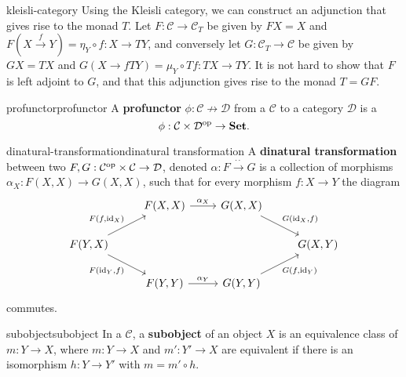 \begin{example}{kleisli-category}
    Using the Kleisli category, we can construct an adjunction that gives rise to the monad $T$. Let $F : \mathcal{C} \to \mathcal{C}_T$ be given by $FX = X$ and $F(X \xrightarrow{f} Y) = \eta_Y \circ f : X \to TY$, and conversely let $G : \mathcal{C}_T \to \mathcal{C}$ be given by $GX = TX$ and $G(X \rightarrow{f} TY) = \mu_Y \circ Tf : TX \to TY$. It is not hard to show that $F$ is left adjoint to $G$, and that this adjunction gives rise to the monad $T = GF$.
\end{example}

\begin{topic}{profunctor}{profunctor}
    A \textbf{profunctor} $\phi : \mathcal{C} \nrightarrow \mathcal{D}$ from a  $\mathcal{C}$ to a category $\mathcal{D}$ is a 
    \[ \phi : \mathcal{C} \times \mathcal{D}^\textup{op} \to \textbf{Set} . \]
\end{topic}

\begin{topic}{dinatural-transformation}{dinatural transformation}
    A \textbf{dinatural transformation} between two  $F, G : \mathcal{C}^\textup{op} \times \mathcal{C} \to \mathcal{D}$, denoted $\alpha : F \xrightarrow{\cdot\cdot} G$ is a collection of morphisms $\alpha_X : F(X, X) \to G(X, X)$, such that for every morphism $f : X \to Y$ the diagram
    \[ \begin{tikzcd} & F(X, X) \arrow{r}{\alpha_X} & G(X, X) \arrow{dr}{G(\id_X, f)} & \\ F(Y, X) \arrow{ur}{F(f, \id_X)} \arrow[swap]{dr}{F(\id_Y, f)} & & & G(X, Y) \\ & F(Y, Y) \arrow{r}{\alpha_Y} & G(Y, Y) \arrow[swap]{ur}{G(f, \id_Y)} & \end{tikzcd} \]
    commutes.
\end{topic}

\begin{topic}{subobject}{subobject}
    In a  $\mathcal{C}$, a \textbf{subobject} of an object $X$ is an equivalence class of  $m : Y \to X$, where $m : Y \to X$ and $m' : Y' \to X$ are equivalent if there is an isomorphism $h : Y \to Y'$ with $m = m' \circ h$.
\end{topic}

